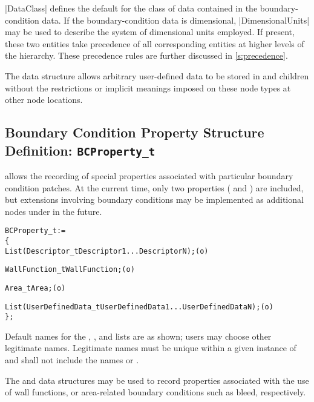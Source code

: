 |DataClass| defines the default for the class of data contained in the
boundary-condition data.
If the boundary-condition data is dimensional, |DimensionalUnits| may be
used to describe the system of dimensional units employed.
If present, these two entities take precedence of all corresponding
entities at higher levels of the hierarchy.
These precedence rules are further discussed in \autoref{s:precedence}.

The  data structure allows arbitrary
user-defined data to be stored in  and
 children without the restrictions or implicit
meanings imposed on these node types at other node locations.

\subsection{Boundary Condition Property Structure Definition: \texttt{BCProperty\_t}}
\label{s:BCProperty}

 allows the recording of special properties associated
with particular boundary condition patches.
At the current time, only two properties (
and ) are included, but extensions involving
boundary conditions may be implemented as additional nodes under
 in the future.

\begin{alltt}
  BCProperty\_t :=
    \{
    List( Descriptor\_t  Descriptor1 ... DescriptorN ) ;                     (o)

    WallFunction\_t WallFunction ;                                           (o)

    Area\_t Area ;                                                           (o)

    List( UserDefinedData\_t UserDefinedData1 ... UserDefinedDataN ) ;       (o)
    \} ;
\end{alltt}

\begin{notes}
\item
 Default names for the , , and
 lists are as shown; users may choose other legitimate names.
 Legitimate names must be unique within a given instance of
  and shall not include the names  or
 .
\end{notes}

The  and  data structures may be
used to record properties associated with the use of wall functions, or
area-related boundary conditions such as bleed, respectively.


